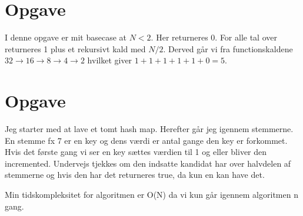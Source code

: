 \documentclass{article}
\begin{document}
\section{Opgave} %
I denne opgave er mit basecase at $N<2$. Her returneres 0. For alle tal over returneres
1 plus et rekursivt kald med $N/2$. Derved går vi fra functionskaldene 
$32 \to 16 \to 8 \to 4 \to 2$ hvilket giver $1+1+1+1+1+0=5$.

\section{Opgave} %
Jeg starter med at lave et tomt hash map. Herefter går jeg igennem 
stemmerne. En stemme fx 7 er en key og dens værdi er antal gange den key
er forkommet. Hvis det første gang vi ser en key sættes værdien til 1 og 
eller bliver den incremented. Undervejs tjekkes om den indsatte kandidat har over
halvdelen af stemmerne og hvis den har det returneres true, da kun en kan have det.

Min tidskompleksitet for algoritmen er O(N) da vi kun går igennem algoritmen n
gang.
\end{document}
